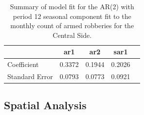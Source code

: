 \documentclass{article} %
\begin{document}


\begin{table}[h]
	\label{tab:data}
	\begin{center}
	\begin{tabular}{lcccc}
			\hline
			&           ar1  &   ar2  &    sar1    \\\hline
Coefficient   &    0.3372  & 0.1944 & 0.2026  \\
Standard Error &  0.0793  & 0.0773 & 0.0921 \\ 
		\end{tabular}
	\caption{Summary of model fit for the AR(2) with period 12 seasonal component fit to the monthly count of armed robberies for the Central Side.}
	\end{center}
\end{table}

 


\subsection{Spatial Analysis}
\label{appendix_spatial}
\end{document}
